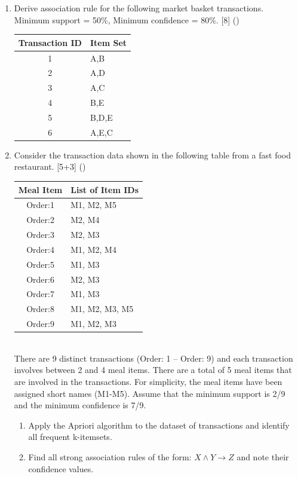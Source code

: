 \documentclass[12pt]{article}
\begin{document}
\begin{enumerate}[topsep=0pt, noitemsep]
      \item Derive association rule for the following market basket transactions. Minimum support = 50\%, Minimum confidence = 80\%. \hfill [8] ()\\
        \small
        \begin{tabular}{|c|l|}
          \hline
          Transaction ID & Item Set \\ \hline
          1 & A,B \\ \hline
          2 & A,D \\ \hline
          3 & A,C \\ \hline
          4 & B,E \\ \hline
          5 & B,D,E \\ \hline
          6 & A,E,C \\ \hline
        \end{tabular}
        \normalsize

      \item Consider the transaction data shown in the following table from a fast food restaurant. \hfill [5+3] ()\\
        \small
        \begin{tabular}{|c|l|}
          \hline
          Meal Item & List of Item IDs \\ \hline
          Order:1 & M1, M2, M5 \\ \hline
          Order:2 & M2, M4 \\ \hline
          Order:3 & M2, M3 \\ \hline
          Order:4 & M1, M2, M4 \\ \hline
          Order:5 & M1, M3 \\ \hline
          Order:6 & M2, M3 \\ \hline
          Order:7 & M1, M3 \\ \hline
          Order:8 & M1, M2, M3, M5 \\ \hline
          Order:9 & M1, M2, M3 \\ \hline
        \end{tabular}
        \normalsize\\
        There are 9 distinct transactions (Order: 1 -- Order: 9) and each transaction involves between 2 and 4 meal items. There are a total of 5 meal items that are involved in the transactions. For simplicity, the meal items have been assigned short names (M1-M5). Assume that the minimum support is 2/9 and the minimum confidence is 7/9.
        \begin{enumerate}[label=(\alph*),topsep=2pt,noitemsep]
          \item Apply the Apriori algorithm to the dataset of transactions and identify all frequent k-itemsets.
          \item Find all strong association rules of the form: $X \wedge Y \rightarrow Z$ and note their confidence values.
        \end{enumerate}


\end{enumerate}
\end{document}
